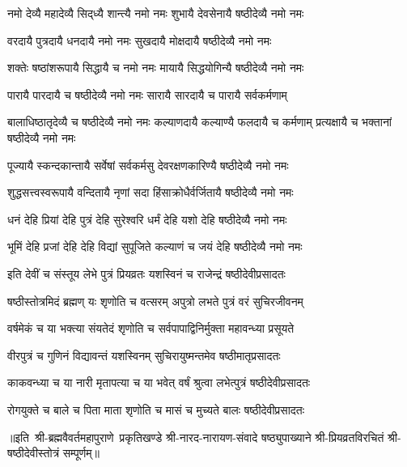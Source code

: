 

\twolineshloka
{नमो देव्यै महादेव्यै सिद्‍ध्यै शान्त्यै नमो नमः}
{शुभायै देवसेनायै षष्ठीदेव्यै नमो नमः}%

\twolineshloka
{वरदायै पुत्रदायै धनदायै नमो नमः}
{सुखदायै मोक्षदायै षष्ठीदेव्यै नमो नमः}%

\twolineshloka
{शक्तेः षष्ठांशरूपायै सिद्धायै च नमो नमः}
{मायायै सिद्धयोगिन्यै षष्ठीदेव्यै नमो नमः}%

\twolineshloka
{पारायै पारदायै च षष्ठीदेव्यै नमो नमः}
{सारायै सारदायै च पारायै सर्वकर्मणाम्}%

\threelineshloka
{बालाधिष्ठातृदेव्यै च षष्ठीदेव्यै नमो नमः}
{कल्याणदायै कल्याण्यै फलदायै च कर्मणाम्}
{प्रत्यक्षायै च भक्तानां षष्ठीदेव्यै नमो नमः}%

\twolineshloka
{पूज्यायै स्कन्दकान्तायै सर्वेषां सर्वकर्मसु}
{देवरक्षणकारिण्यै षष्ठीदेव्यै नमो नमः}%

\twolineshloka
{शुद्धसत्त्वस्वरूपायै वन्दितायै नृणां सदा}
{हिंसाक्रोधैर्वर्जितायै षष्ठीदेव्यै नमो नमः}%

\twolineshloka
{धनं देहि प्रियां देहि पुत्रं देहि सुरेश्वरि}
{धर्मं देहि यशो देहि षष्ठीदेव्यै नमो नमः}%

\twolineshloka
{भूमिं देहि प्रजां देहि देहि विद्यां सुपूजिते}
{कल्याणं च जयं देहि षष्ठीदेव्यै नमो नमः}%

\twolineshloka
{इति देवीं च संस्तूय लेभे पुत्रं प्रियव्रतः}
{यशस्विनं च राजेन्द्रं षष्ठीदेवीप्रसादतः}%

\twolineshloka
{षष्ठीस्तोत्रमिदं ब्रह्मण् यः शृणोति च वत्सरम्}
{अपुत्रो लभते पुत्रं वरं सुचिरजीवनम्}

\twolineshloka
{वर्षमेकं च या भक्त्या संयतेदं शृणोति च}
{सर्वपापाद्विनिर्मुक्ता महावन्ध्या प्रसूयते}

\twolineshloka
{वीरपुत्रं च गुणिनं विद्यावन्तं यशस्विनम्}
{सुचिरायुष्मन्तमेव षष्ठीमातृप्रसादतः}

\twolineshloka
{काकवन्ध्या च या नारी मृतापत्या च या भवेत्}
{वर्षं श्रुत्वा लभेत्पुत्रं षष्ठीदेवीप्रसादतः}

\twolineshloka
{रोगयुक्ते च बाले च पिता माता शृणोति च}
{मासं  च मुच्यते बालः षष्ठीदेवीप्रसादतः}

{॥इति~श्री-ब्रह्मवैवर्तमहापुराणे~प्रकृतिखण्डे श्री-नारद-नारायण-संवादे षष्ठ्युपाख्याने श्री-प्रियव्रतविरचितं श्री-षष्ठीदेवीस्तोत्रं सम्पूर्णम्॥}